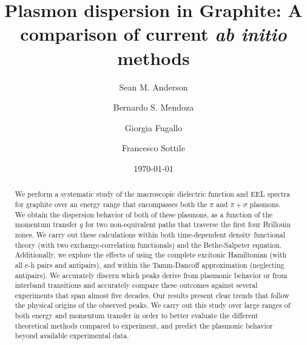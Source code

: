 \documentclass[aps,prb,10pt,showpacs,superscriptaddress,twocolumn,notitlepage]{revtex4-1}
\begin{document}
\title{Plasmon dispersion in Graphite: A comparison of current \emph{ab initio}
methods}
\author{Sean M. Anderson}
\author{Bernardo S. Mendoza}%
\author{Giorgia Fugallo}%
\author{Francesco Sottile}%
\date{\today}

\begin{abstract}
We perform a systematic study of the macroscopic dielectric function and EEL
spectra for graphite over an energy range that encompasses both the $\pi$ and
$\pi + \sigma$ plasmons. We obtain the dispersion behavior of both of these
plasmons, as a function of the momentum transfer $q$ for two non-equivalent
paths that traverse the first four Brillouin zones. We carry out these
calculations within both time-dependent density functional theory (with two
exchange-correlation functionals) and the Bethe-Salpeter equation. Additionally,
we explore the effects of using the complete excitonic Hamiltonian (with all e-h
pairs and antipairs), and within the Tamm-Dancoff approximation (neglecting
antipairs). We accurately discern which peaks derive from plasmonic behavior or
from interband transitions and accurately compare these outcomes against several
experiments that span almost five decades. Our results present clear trends that
follow the physical origins of the observed peaks. We carry out this study over
large ranges of both energy and momentum transfer in order to better evaluate
the different theoretical methods compared to experiment, and predict the
plasmonic behavior beyond available experimental data.
\end{abstract}

\maketitle

\end{document}
